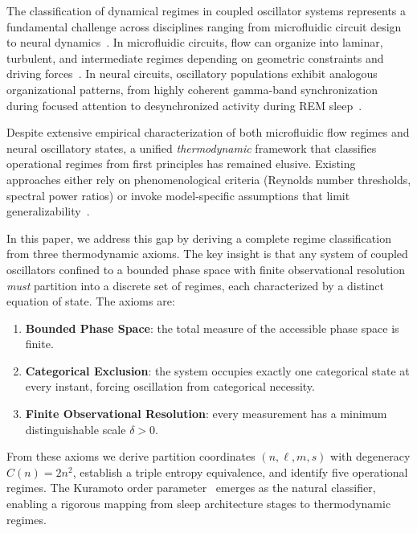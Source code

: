 \documentclass[aps,prd,twocolumn,superscriptaddress,floatfix,nofootinbib]{revtex4-2}
\theoremstyle{remark}
\begin{document}
The classification of dynamical regimes in coupled oscillator systems represents a fundamental challenge across disciplines ranging from microfluidic circuit design~\cite{whitesides2006origins,stone2004engineering} to neural dynamics~\cite{buzsaki2006rhythms,fries2005mechanism}. In microfluidic circuits, flow can organize into laminar, turbulent, and intermediate regimes depending on geometric constraints and driving forces~\cite{squires2005microfluidics}. In neural circuits, oscillatory populations exhibit analogous organizational patterns, from highly coherent gamma-band synchronization during focused attention to desynchronized activity during REM sleep~\cite{varela2001brainweb,hobson2002cognitive}.

Despite extensive empirical characterization of both microfluidic flow regimes and neural oscillatory states, a unified \emph{thermodynamic} framework that classifies operational regimes from first principles has remained elusive. Existing approaches either rely on phenomenological criteria (Reynolds number thresholds, spectral power ratios) or invoke model-specific assumptions that limit generalizability~\cite{strogatz2015nonlinear}.

In this paper, we address this gap by deriving a complete regime classification from three thermodynamic axioms. The key insight is that any system of coupled oscillators confined to a bounded phase space with finite observational resolution \emph{must} partition into a discrete set of regimes, each characterized by a distinct equation of state. The axioms are:
\begin{enumerate}
    \item \textbf{Bounded Phase Space}: the total measure of the accessible phase space is finite.
    \item \textbf{Categorical Exclusion}: the system occupies exactly one categorical state at every instant, forcing oscillation from categorical necessity.
    \item \textbf{Finite Observational Resolution}: every measurement has a minimum distinguishable scale $\delta > 0$.
\end{enumerate}

From these axioms we derive partition coordinates $(n, \ell, m, s)$ with degeneracy $C(n) = 2n^2$, establish a triple entropy equivalence, and identify five operational regimes. The Kuramoto order parameter~\cite{kuramoto1984chemical} emerges as the natural classifier, enabling a rigorous mapping from sleep architecture stages to thermodynamic regimes.
\end{document}
